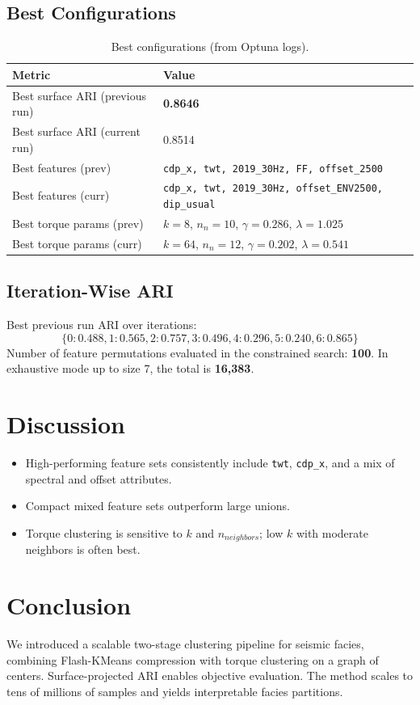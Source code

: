 \documentclass{article}
\begin{document}
\subsection{Best Configurations}
\begin{table}[t]
\centering
\caption{Best configurations (from Optuna logs).}
\label{tab:best}
\begin{tabular}{l l}
\toprule
\textbf{Metric} & \textbf{Value} \\
\midrule
Best surface ARI (previous run) & \textbf{0.8646} \\
Best surface ARI (current run)  & 0.8514 \\
\midrule
Best features (prev) & \texttt{cdp\_x, twt, 2019\_30Hz, FF, offset\_2500} \\
Best features (curr) & \texttt{cdp\_x, twt, 2019\_30Hz, offset\_ENV2500, dip\_usual} \\
\midrule
Best torque params (prev) & $k=8$, $n_n=10$, $\gamma=0.286$, $\lambda=1.025$ \\
Best torque params (curr) & $k=64$, $n_n=12$, $\gamma=0.202$, $\lambda=0.541$ \\
\bottomrule
\end{tabular}
\end{table}

\subsection{Iteration-Wise ARI}
Best previous run ARI over iterations:
\[
\{0: 0.488, 1: 0.565, 2: 0.757, 3: 0.496, 4: 0.296, 5: 0.240, 6: 0.865\}
\]
Number of feature permutations evaluated in the constrained search: \textbf{100}. In exhaustive mode up to size 7, the total is \textbf{16,383}.

\section{Discussion}
\begin{itemize}
\item High-performing feature sets consistently include \texttt{twt}, \texttt{cdp\_x}, and a mix of spectral and offset attributes.
\item Compact mixed feature sets outperform large unions.
\item Torque clustering is sensitive to $k$ and $n_{neighbors}$; low $k$ with moderate neighbors is often best.
\end{itemize}

\section{Conclusion}
We introduced a scalable two-stage clustering pipeline for seismic facies, combining Flash-KMeans compression with torque clustering on a graph of centers. Surface-projected ARI enables objective evaluation. The method scales to tens of millions of samples and yields interpretable facies partitions.
\end{document}
